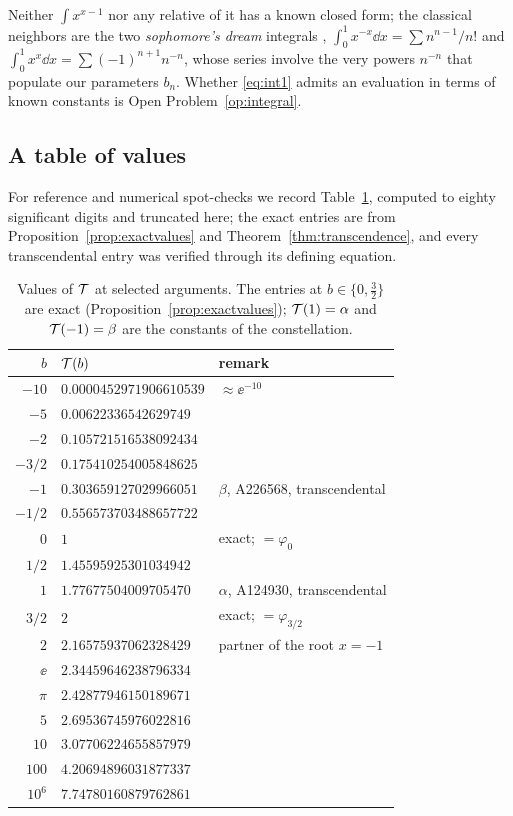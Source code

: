 Neither $\int x^{x-1}$ nor any relative of it has a known closed
form; the classical neighbors are the two \emph{sophomore's dream}
integrals \cite{mathworld-sd},
$\int_{0}^{1} x^{-x}\dd x = \sum n^{n-1}/n!$ and
$\int_{0}^{1} x^{x} \dd x = \sum (-1)^{n+1} n^{-n}$, whose series
involve the very powers $n^{-n}$ that populate our parameters $b_n$.
Whether \eqref{eq:int1} admits an evaluation in terms of known
constants is Open Problem~\ref{op:integral}.

\subsection{A table of values}

For reference and numerical spot-checks we record
Table~\ref{tab:values}, computed to eighty significant digits and
truncated here; the exact entries are from
Proposition~\ref{prop:exactvalues} and
Theorem~\ref{thm:transcendence}, and every transcendental entry was
verified through its defining equation.

\begin{table}[t]
\centering
\small
\caption{Values of $\mathcal{T}$ at selected arguments. The entries at
$b \in \{0, \tfrac32\}$ are exact (Proposition~\ref{prop:exactvalues});
$\mathcal{T}(1) = \alpha$ and $\mathcal{T}(-1) = \beta$ are the constants of the
constellation.}
\label{tab:values}
\begin{tabular}{rll}
\toprule
$b$ & $\mathcal{T}(b)$ & remark \\
\midrule
$-10$    & $0.0000452971906610539$ & $\approx \ee^{-10}$ \\
$-5$     & $0.00622336542629749$  &  \\
$-2$     & $0.105721516538092434$ &  \\
$-3/2$   & $0.175410254005848625$ &  \\
$-1$     & $0.303659127029966051$ & $\beta$, A226568, transcendental \\
$-1/2$   & $0.556573703488657722$ &  \\
$0$      & $1$                    & exact; $=\varphi_0$ \\
$1/2$    & $1.45595925301034942$  &  \\
$1$      & $1.77677504009705470$  & $\alpha$, A124930, transcendental \\
$3/2$    & $2$                    & exact; $=\varphi_{3/2}$ \\
$2$      & $2.16575937062328429$  & partner of the root $x = -1$ \\
$\ee$     & $2.34459646238796334$ &  \\
$\pi$     & $2.42877946150189671$  &  \\
$5$      & $2.69536745976022816$  &  \\
$10$     & $3.07706224655857979$  &  \\
$100$    & $4.20694896031877337$  &  \\
$10^{6}$ & $7.74780160879762861$  &  \\
\bottomrule
\end{tabular}
\end{table}

